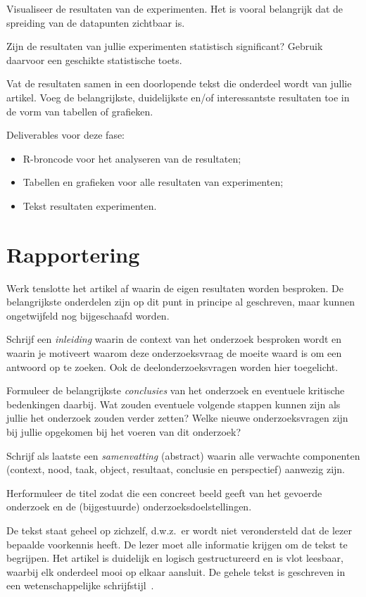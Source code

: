 \documentclass[fleqn,10pt]{voorstel}
\begin{document}
Visualiseer de resultaten van de experimenten. Het is vooral belangrijk dat de spreiding van de datapunten zichtbaar is.

Zijn de resultaten van jullie experimenten statistisch significant? Gebruik daarvoor een geschikte statistische toets.

Vat de resultaten samen in een doorlopende tekst die onderdeel wordt van jullie artikel. Voeg de belangrijkste, duidelijkste en/of interessantste resultaten toe in de vorm van tabellen of grafieken.

Deliverables voor deze fase:

\begin{itemize}
  \item R-broncode voor het analyseren van de resultaten;
  \item Tabellen en grafieken voor alle resultaten van experimenten;
  \item Tekst resultaten experimenten.
\end{itemize}

\section{Rapportering}

Werk tenslotte het artikel af waarin de eigen resultaten worden besproken. De belangrijkste onderdelen zijn op dit punt in principe al geschreven, maar kunnen ongetwijfeld nog bijgeschaafd worden.

Schrijf een \emph{inleiding} waarin de context van het onderzoek besproken wordt en waarin je motiveert waarom deze onderzoeksvraag de moeite waard is om een antwoord op te zoeken. Ook de deelonderzoeksvragen worden hier toegelicht.

Formuleer de belangrijkste \emph{conclusies} van het onderzoek en eventuele kritische bedenkingen daarbij. Wat zouden eventuele volgende stappen kunnen zijn als jullie het onderzoek zouden verder zetten? Welke nieuwe onderzoeksvragen zijn bij jullie opgekomen bij het voeren van dit onderzoek?

Schrijf als laatste een \emph{samenvatting} (abstract) waarin alle verwachte componenten (context, nood, taak, object, resultaat, conclusie en perspectief) aanwezig zijn.

Herformuleer de titel zodat die een concreet beeld geeft van het gevoerde onderzoek en de (bijgestuurde) onderzoeksdoelstellingen.

De tekst staat geheel op zichzelf, d.w.z.~er wordt niet verondersteld dat de lezer bepaalde voorkennis heeft. De lezer moet alle informatie krijgen om de tekst te begrijpen. Het artikel is duidelijk en logisch gestructureerd en is vlot leesbaar, waarbij elk onderdeel mooi op elkaar aansluit. De gehele tekst is geschreven in een wetenschappelijke schrijfstijl~\autocite{Taalwinkel2014}.
\end{document}
